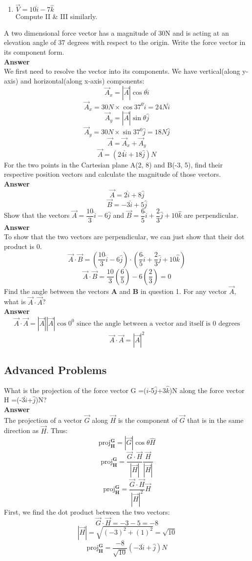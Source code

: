 \documentclass[9pt,addpoints]{exam}
\begin{document}
\begin{questions}
\begin{enumerate}[label=(\Roman*)]
			\item ${\vec{V}}=10\hat{i}-7\hat{k}$
			\\ Compute II \& III similarly.
		\end{enumerate}
		\question A two dimensional force vector has a magnitude of 30N and is acting at an elevation angle of 37 degrees with respect to the origin. Write the force vector in its component form. \\ \textbf{Answer} \\
		We first need to resolve the vector into its components. We have vertical(along y-axis) and horizontal(along x-axis) components:
		$$\vec{A}_x=|\vec{A}|\cos\theta\hat{i}$$
		$$\vec{A}_x=30N\times\cos37^0\hat{i}=24N\hat{i}$$
		$$\vec{A}_y=|\vec{A}|\sin\theta\hat{j}$$
		$$\vec{A}_y=30N\times\sin37^0\hat{j}=18N\hat{j}$$
		$$\vec{A}=\vec{A}_x+\vec{A}_y$$
		$$\vec{A}=(24\hat{i}+18\hat{j})N$$		
		\question For the two points in the Cartesian plane A(2, 8) and B(-3, 5), find their respective position vectors and calculate the magnitude of those vectors.\\ \textbf{Answer} \\
		$$\vec{A}=2\hat{i}+8\hat{j}$$
		$$\vec{B}=-3\hat{i}+5\hat{j}$$
		\question Show that the vectors $\vec{A}=\dfrac{10}{3}\hat{i}-6\hat{j}$ and $\vec{B}=\dfrac{6}{5}\hat{i}+\dfrac{2}{3}\hat{j}+10\hat{k}$ are perpendicular. \\ \textbf{Answer} \\
		To show that the two vectors are perpendicular, we can just show that their dot product is 0.
		$$\vec{A}\cdot\vec{B}=(\dfrac{10}{3}\hat{i}-6\hat{j})\cdot(\dfrac{6}{5}\hat{i}+\dfrac{2}{3}\hat{j}+10\hat{k})$$
		$$\vec{A}\cdot\vec{B}=\dfrac{10}{3}(\dfrac{6}{5})-6(\dfrac{2}{3})=0$$
		\question Find the angle between the vectors \textbf{A} and \textbf{B} in question 1.
		\question For any vector $\vec{A}$, what is $\vec{A}\cdot\vec{A}$?\\ \textbf{Answer} \\
		$$\vec{A}\cdot\vec{A}=|\vec{A}||\vec{A}|\cos0^0\text{ since the angle between a vector and itself is 0 degrees}$$
		$$\vec{A}\cdot\vec{A}=|\vec{A}|^2$$
		\subsection*{Advanced Problems}
		\question What is the projection of the force vector  G =($\hat{i}$-5$\hat{j}$+3$\hat{k}$)N along the force vector  H =(-3$\hat{i}$+$\hat{j}$)N?\\ \textbf{Answer} \\
		The projection of a vector $\vec{G}$ along $\vec{H}$ is the component of $\vec{G}$ that is in the same direction as $\vec{H}$. Thus:
		$$\text{proj}^\textbf{G}_\textbf{H}=|\vec{G}|\cos\theta\hat{H}$$
		$$\text{proj}^\textbf{G}_\textbf{H}=\dfrac{\vec{G}\cdot\vec{H}}{|\vec{H}|}\dfrac{\vec{H}}{|\vec{H}|}$$
		$$\text{proj}^\textbf{G}_\textbf{H}=\dfrac{\vec{G}\cdot\vec{H}}{|\vec{H}|^2}\vec{H}$$
		First, we find the dot product between the two vectors:
		$$\vec{G}\cdot\vec{H}=-3-5=-8$$
		$$|\vec{H}|=\sqrt{(-3)^2+(1)^2}=\sqrt{10}$$
		$$\text{proj}^\textbf{G}_\textbf{H}=\dfrac{-8}{\sqrt{10}}(-3\hat{i}+\hat{j})N$$
	\end{questions}		
\end{document}
